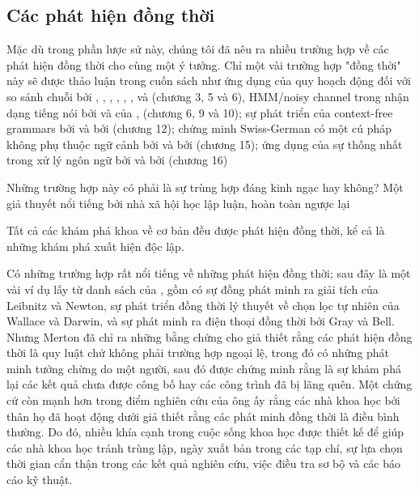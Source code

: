 \subsection{Các phát hiện đồng thời}

Mặc dù trong phần lược sử này, chúng tôi đã nêu ra nhiều trường hợp về các phát hiện đồng thời cho cùng một ý tưởng. Chỉ một vài trường hợp "đồng thời" này sẽ được thảo luận trong cuốn sách như ứng dụng của quy hoạch động đối với so sánh chuỗi bởi \citet{viterbi1967error}, \citet{vintsyuk1968speech}, \citet{needleman1970general}, \citet{sakoe1971dynamic}, \citet{sankoff1972matching}, \citet{reichert1973application}, và \citet{wagner1974string} (chương 3, 5 và 6), HMM/noisy channel trong nhận dạng tiếng nói bởi \citet{baker1990stochastic} và của \citet{jelinek1976continuous}, \citet{bahl1986maximum} (chương 6, 9 và 10); sự phát triển của context-free grammars bởi \citet{chomsky1963formal} và bởi \citet{backus1959syntax} (chương 12); chứng minh Swiss-German có một cú pháp không phụ thuộc ngữ cảnh bởi \citet{huybregts1984weak} và bởi \citet{shieber1985evidence} (chương 15); ứng dụng của sự thống nhất trong xử lý ngôn ngữ bởi \citet{colmerauer1996birth} và bởi \citet{kay1999grammatical} (chương 16)

Những trường hợp này có phải là sự trùng hợp đáng kinh ngạc hay không? Một giả thuyết nổi tiếng bởi nhà xã hội học \citet{merton1961social} lập luận, hoàn toàn ngược lại

\begin{adjustwidth}{1.5cm}{}
Tất cả các khám phá khoa về cơ bản đều được phát hiện đồng thời, kể cả là những khám phá xuất hiện độc lập.
\end{adjustwidth}

Có những trường hợp rất nổi tiếng về những phát hiện đồng thời; sau đây là một vài ví dụ lấy từ danh sách của \citet{ogburn1922inventions}, gồm có sự đồng phát minh ra giải tích của Leibnitz và Newton, sự phát triển đồng thời lý thuyết về chọn lọc tự nhiên của Wallace và Darwin, và sự phát minh ra điện thoại đồng thời bởi Gray và Bell. Nhưng Merton đã chỉ ra những bằng chứng cho giả thiết rằng các phát hiện đồng thời là quy luật chứ không phải trường hợp ngoại lệ, trong đó có những phát minh tưởng chừng do một người, sau đó được chứng minh rằng là sự khám phá lại các kết quả chưa được công bố hay các công trình đã bị lãng quên. Một chứng cứ còn mạnh hơn trong điểm nghiên cứu của ông ấy rằng các nhà khoa học bởi thân họ đã hoạt động dưới giả thiết rằng các phát minh đồng thời là điều bình thường. Do đó, nhiều khía cạnh trong cuộc sống khoa học được thiết kế để giúp các nhà khoa học tránh trùng lập, ngày xuất bản trong các tạp chí, sự lựa chọn thời gian cẩn thận trong các kết quả nghiên cứu, việc điều tra sơ bộ và các báo cáo kỹ thuật.

